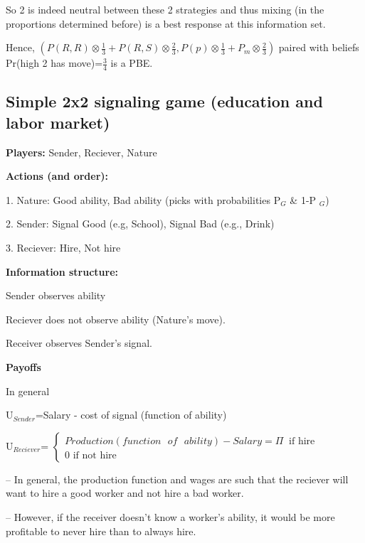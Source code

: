 \documentclass{article}
\begin{document}
So 2 is indeed neutral between these 2 strategies and thus mixing (in the
proportions determined before) is a best response at this information set.

\bigskip

Hence, $(P(R,R)\otimes \frac{1}{3}+P(R,S)\otimes \frac{2}{3},P(p)\otimes
\frac{1}{3}+P_{m}\otimes \frac{2}{3})$ paired with beliefs Pr(high%
\TEXTsymbol{\vert}2 has move)=$\frac{3}{4}$ is a PBE.

\bigskip

\bigskip

\subsection{Simple 2x2 signaling game (education and labor market)}

\textbf{Players: }Sender, Reciever, Nature

\bigskip

\textbf{Actions (and order):}

1. Nature: Good ability, Bad ability (picks with probabilities P$_{G}$ \& 1-P%
$_{G}$)

2. Sender: Signal Good (e.g, School), Signal Bad (e.g., Drink)

3. Reciever: Hire, Not hire

\bigskip

\textbf{Information structure:}

Sender observes ability

Reciever does not observe ability (Nature's move).

Receiver observes Sender's signal.

\bigskip

\textbf{Payoffs}

In general

U$_{Sender}$=Salary - cost of signal (function of ability)

U$_{Reciever}$= $\left\{
\begin{array}{c}
Production(function\text{ }of\text{ }ability)-Salary=\Pi \ \text{\ if hire}
\\
0\text{ if not hire}%
\end{array}%
\right. $

-- In general, the production function and wages are such that the reciever
will want to hire a good worker and not hire a bad worker.

-- However, if the receiver doesn't know a worker's ability, it would be
more profitable to never hire than to always hire.\bigskip
\end{document}
